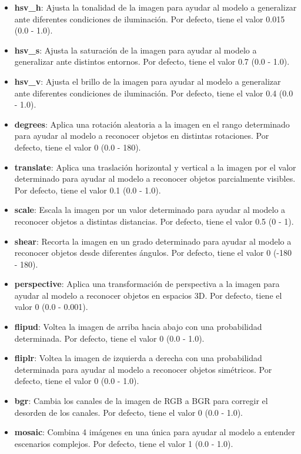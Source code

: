 \documentclass[12pt,a4paper,onecolumn,oneside]{report}
\begin{document}
\begin{itemize}
    \item \textbf{hsv\_h}: Ajusta la tonalidad de la imagen para ayudar al modelo a generalizar ante diferentes condiciones de iluminación. Por defecto, tiene el valor 0.015 (0.0 - 1.0).
    \item \textbf{hsv\_s}: Ajusta la saturación de la imagen para ayudar al modelo a generalizar ante distintos entornos. Por defecto, tiene el valor 0.7 (0.0 - 1.0).
    \item \textbf{hsv\_v}: Ajusta el brillo de la imagen para ayudar al modelo a generalizar ante diferentes condiciones de iluminación. Por defecto, tiene el valor 0.4 (0.0 - 1.0).
    \item \textbf{degrees}: Aplica una rotación aleatoria a la imagen en el rango determinado para ayudar al modelo a reconocer objetos en distintas rotaciones. Por defecto, tiene el valor 0 (0.0 - 180).
    \item \textbf{translate}: Aplica una traslación horizontal y vertical a la imagen por el valor determinado para ayudar al modelo a reconocer objetos parcialmente visibles. Por defecto, tiene el valor 0.1 (0.0 - 1.0).    
    \item \textbf{scale}: Escala la imagen por un valor determinado para ayudar al modelo a reconocer objetos a distintas distancias. Por defecto, tiene el valor 0.5 (0 - 1).
    \item \textbf{shear}: Recorta la imagen en un grado determinado para ayudar al modelo a reconocer objetos desde diferentes ángulos. Por defecto, tiene el valor 0 (-180 - 180).
    \item \textbf{perspective}: Aplica una transformación de perspectiva a la imagen para ayudar al modelo a reconocer objetos en espacios 3D. Por defecto, tiene el valor 0 (0.0 - 0.001).
    \item \textbf{flipud}: Voltea la imagen de arriba hacia abajo con una probabilidad determinada. Por defecto, tiene el valor 0 (0.0 - 1.0).
    \item \textbf{fliplr}: Voltea la imagen de izquierda a derecha con una probabilidad determinada para ayudar al modelo a reconocer objetos simétricos. Por defecto, tiene el valor 0 (0.0 - 1.0).
    \item \textbf{bgr}: Cambia los canales de la imagen de RGB a BGR para corregir el desorden de los canales. Por defecto, tiene el valor 0 (0.0 - 1.0).
    \item \textbf{mosaic}: Combina 4 imágenes en una única para ayudar al modelo a entender escenarios complejos. Por defecto, tiene el valor 1 (0.0 - 1.0). 

\end{itemize}
\end{document}
